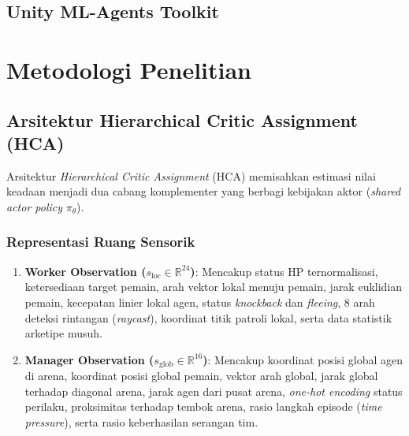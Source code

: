 \documentclass[conference]{IEEEtran}
\begin{document}
\subsection{Unity ML-Agents Toolkit}
\section{Metodologi Penelitian}

\subsection{Arsitektur Hierarchical Critic Assignment (HCA)}
Arsitektur \textit{Hierarchical Critic Assignment} (HCA) memisahkan estimasi nilai keadaan menjadi dua cabang komplementer yang berbagi kebijakan aktor (\textit{shared actor policy} \(\pi_\theta\)).

\subsubsection{Representasi Ruang Sensorik}
\begin{enumerate}
    \item \textbf{Worker Observation (\(s_{\text{loc}} \in \mathbb{R}^{24}\))}: Mencakup status HP ternormalisasi, ketersediaan target pemain, arah vektor lokal menuju pemain, jarak euklidian pemain, kecepatan linier lokal agen, status \textit{knockback} dan \textit{fleeing}, 8 arah deteksi rintangan (\textit{raycast}), koordinat titik patroli lokal, serta data statistik arketipe musuh.
    \item \textbf{Manager Observation (\(s_{\text{glob}} \in \mathbb{R}^{16}\))}: Mencakup koordinat posisi global agen di arena, koordinat posisi global pemain, vektor arah global, jarak global terhadap diagonal arena, jarak agen dari pusat arena, \textit{one-hot encoding} status perilaku, proksimitas terhadap tembok arena, rasio langkah episode (\textit{time pressure}), serta rasio keberhasilan serangan tim.
\end{enumerate}
\end{document}
